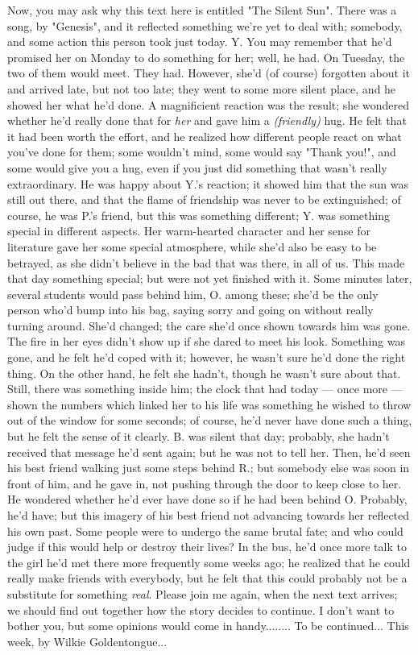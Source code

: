 Now, you may ask why this text here is entitled "The Silent Sun". There was a song, by "Genesis", and it reflected something we're yet to deal with; somebody, and some action this person took just today. Y. 
You may remember that he'd promised her on Monday to do something for her; well, he had. 
On Tuesday, the two of them would meet. They had. However, she'd (of course) forgotten about it and arrived late, but not too late; they went to some more silent place, and he showed her what he'd done. 
A magnificient reaction was the result; she wondered whether he'd really done that for \emph{her} and gave him a \emph{(friendly)} hug. He felt that it had been worth the effort, and he realized how different people react on what you've done for them; some wouldn't mind, some would say "Thank you!", and some would give you a hug, even if you just did something that wasn't really extraordinary. He was happy about Y.'s reaction; it showed him that the sun was still out there, and that the flame of friendship was never to be extinguished; of course, he was P.'s friend, but this was something different; Y. was something special in different aspects. Her warm-hearted character and her sense for literature gave her some special atmosphere, while she'd also be easy to be betrayed, as she didn't believe in the bad that was there, in all of us. 
This made that day something special; but were not yet finished with it. Some minutes later, several students would pass behind him, O. among these; she'd be the only person who'd bump into his bag, saying sorry and going on without really turning around. She'd changed; the care she'd once shown towards him was gone. 
The fire in her eyes didn't show up if she dared to meet his look. Something was gone, and he felt he'd coped with it; however, he wasn't sure he'd done the right thing. On the other hand, he felt she hadn't, though he wasn't sure about that. 
Still, there was something inside him; the clock that had today --- once more --- shown the numbers which linked her to his life was something he wished to throw out of the window for some seconds; of course, he'd never have done such a thing, but he felt the sense of it clearly. 
B. was silent that day; probably, she hadn't received that message he'd sent again; but he was not to tell her. Then, he'd seen his best friend walking just some steps behind R.; but somebody else was soon in front of him, and he gave in, not pushing through the door to keep close to her. He wondered whether he'd ever have done so if he had been behind O. Probably, he'd have; but this imagery of his best friend not advancing towards her reflected his own past. 
Some people were to undergo the same brutal fate; and who could judge if this would help or destroy their lives?
In the bus, he'd once more talk to the girl he'd met there more frequently some weeks ago; he realized that he could really make friends with everybody, but he felt that this could probably not be a substitute for something \emph{real}. 
Please join me again, when the next text arrives; we should find out together how the story decides to continue. 
I don't want to bother you, but some opinions would come in handy........
To be continued...
This week, by Wilkie Goldentongue...


